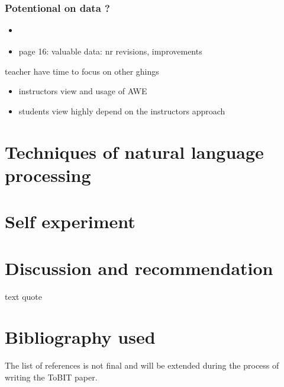 \documentclass[runningheads]{llncs}
\begin{document}
\subsubsection{Potentional on data ?}
\begin{itemize}
 \item \citep{warschauer_automated_2006} 
 \item page 16: valuable data: nr revisions, improvements
\end{itemize}



teacher have time to focus on other ghings

\cite{li_rethinking_2015}
\begin{itemize}
 \item instructors view and usage of AWE
 \item students view highly depend on the instructors approach
\end{itemize}


\section{Techniques of natural language processing}

\section{Self experiment}


\section{Discussion and recommendation}



text quote 
\newline


\section{Bibliography used}
The list of references is not final and will be extended during the process of writing the ToBIT paper.
\printbibliography
\end{document}
